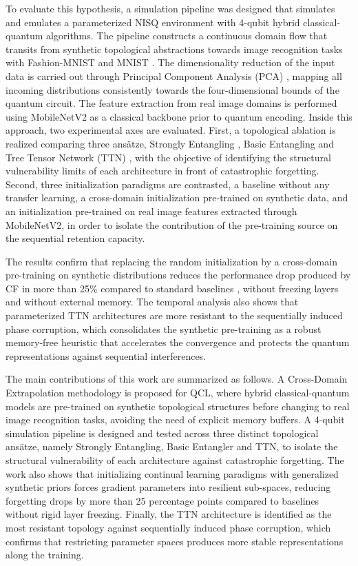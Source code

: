 \documentclass[runningheads]{llncs}
\begin{document}
To evaluate this hypothesis, a simulation pipeline was designed that simulates and emulates a parameterized NISQ environment with 4-qubit hybrid classical-quantum algorithms. The pipeline constructs a continuous domain flow that transits from synthetic topological abstractions towards image recognition tasks with Fashion-MNIST \cite{Xiao17} and MNIST \cite{Lecun98}. The dimensionality reduction of the input data is carried out through Principal Component Analysis (PCA) \cite{pearson1901lines}, mapping all incoming distributions consistently towards the four-dimensional bounds of the quantum circuit. The feature extraction from real image domains is performed using MobileNetV2 \cite{Sandler18} as a classical backbone prior to quantum encoding. Inside this approach, two experimental axes are evaluated. First, a topological ablation is realized comparing three ans\"atze, Strongly Entangling \cite{sim2019expressibility}, Basic Entangling and Tree Tensor Network (TTN) \cite{grant2018hierarchical}, with the objective of identifying the structural vulnerability limits of each architecture in front of catastrophic forgetting. Second, three initialization paradigms are contrasted, a baseline without any transfer learning, a cross-domain initialization pre-trained on synthetic data, and an initialization pre-trained on real image features extracted through MobileNetV2, in order to isolate the contribution of the pre-training source on the sequential retention capacity.

The results confirm that replacing the random initialization by a cross-domain pre-training on synthetic distributions reduces the performance drop produced by CF in more than 25\% compared to standard baselines \cite{buzzega2020dark,kirkpatrick2017overcoming}, without freezing layers and without external memory. The temporal analysis also shows that parameterized TTN architectures are more resistant to the sequentially induced phase corruption, which consolidates the synthetic pre-training as a robust memory-free heuristic that accelerates the convergence \cite{Mitarai18} and protects the quantum representations against sequential interferences.

The main contributions of this work are summarized as follows. A Cross-Domain Extrapolation methodology is proposed for QCL, where hybrid classical-quantum models are pre-trained on synthetic topological structures before changing to real image recognition tasks, avoiding the need of explicit memory buffers. A 4-qubit simulation pipeline is designed and tested across three distinct topological ans\"atze, namely Strongly Entangling, Basic Entangler and TTN, to isolate the structural vulnerability of each architecture against catastrophic forgetting. The work also shows that initializing continual learning paradigms with generalized synthetic priors forces gradient parameters into resilient sub-spaces, reducing forgetting drops by more than 25 percentage points compared to baselines without rigid layer freezing. Finally, the TTN architecture is identified as the most resistant topology against sequentially induced phase corruption, which confirms that restricting parameter spaces produces more stable representations along the training.
\end{document}
